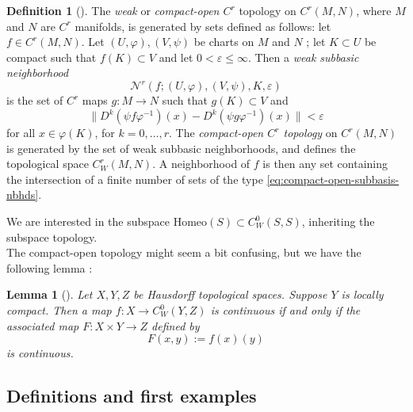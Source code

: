 \documentclass[reqno]{amsart}
\newtheorem{lemma}[theorem]{Lemma}
\theoremstyle{definition}
\newtheorem{definition}[theorem]{Definition}
\theoremstyle{remark}
\newcommand{\Homeo}{{\mathrm{Homeo}}}
\begin{document}
\begin{definition}[]
    The \textit{weak} or \textit{compact-open $C^{r}$ }
    topology on $C^{r} \left( M,N \right) $, where
    $M$ and $N$ are $C^{r}$ manifolds, is generated
    by sets defined as follows:
    let $f \in C^{r}(M,N)$. Let $\left( U, \varphi \right),
    \left( V, \psi  \right) $ be charts on
    $M$ and $N$ ; let $K \subset U$ be compact such that
    $f(K) \subset V$ and let $0 < \varepsilon \le 
    \infty $. Then a \textit{weak subbasic neighborhood}
    \[
    \mathcal{N}^{r} \left( f ; \left( U, \varphi  \right) ,
    \left( V, \psi  \right) , K, \varepsilon \right) 
    \tag{$\zeta$}\label{eq:compact-open-subbasis-nbhds}
    \] 
    is the set of $C^{r}$ maps $g \colon M \to N$ such that
    $g(K) \subset V$ and
    \[
    \|D^{k}\left( \psi f \varphi^{-1} \right) (x)
    -D^{k} \left( \psi g \varphi^{-1} \right) (x)\|< \varepsilon
    \] 
    for all $x \in \varphi(K)$, for $k = 0, \ldots, r$.
    The \textit{compact-open $C^{r}$ topology} on
    $C^{r}(M,N)$ is generated by the set of weak subbasic
    neighborhoods, and defines the topological space
    $C_W^{r} (M,N)$.
    A neighborhood of $f$ is then
    any set containing the intersection
    of a finite number of sets of the
    type \eqref{eq:compact-open-subbasis-nbhds}.
\end{definition}

We are interested in the subspace
$\Homeo (S) \subset C_W^{0} (S,S)$, inheriting the
subspace topology.\\
\linebreak
The compact-open topology might seem a bit confusing, but
we have the following lemma \cite[Prop A.14]{Hatcher}:

\begin{lemma}[]\label{compact-open-isotopy}
    Let $X,Y,Z$ be Hausdorff topological spaces.
    Suppose $Y$ is locally compact. Then a 
    map $f \colon X \to C_W^{0}(Y,Z)$ is
    continuous if and only if the associated map
    $F \colon X \times Y \to Z$ defined by
    \[
    F(x,y) := f(x)(y)
    \] 
    is continuous.
\end{lemma}





\subsection{Definitions and first examples}
\end{document}
